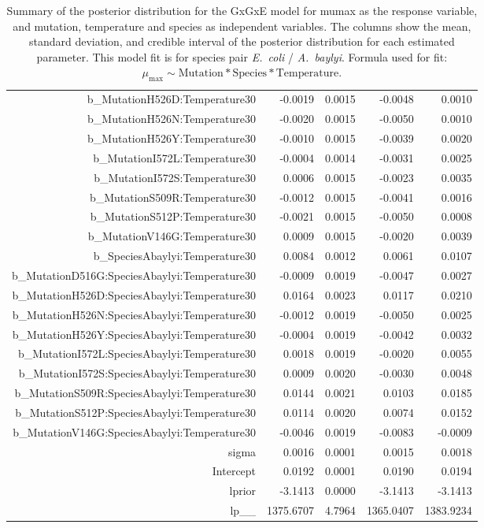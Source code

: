 \begin{table}[ht]
\begin{tabular}{rrrrr}
  b\_MutationH526D:Temperature30 & -0.0019 & 0.0015 & -0.0048 & 0.0010 \\ 
  b\_MutationH526N:Temperature30 & -0.0020 & 0.0015 & -0.0050 & 0.0010 \\ 
  b\_MutationH526Y:Temperature30 & -0.0010 & 0.0015 & -0.0039 & 0.0020 \\ 
  b\_MutationI572L:Temperature30 & -0.0004 & 0.0014 & -0.0031 & 0.0025 \\ 
  b\_MutationI572S:Temperature30 & 0.0006 & 0.0015 & -0.0023 & 0.0035 \\ 
  b\_MutationS509R:Temperature30 & -0.0012 & 0.0015 & -0.0041 & 0.0016 \\ 
  b\_MutationS512P:Temperature30 & -0.0021 & 0.0015 & -0.0050 & 0.0008 \\ 
  b\_MutationV146G:Temperature30 & 0.0009 & 0.0015 & -0.0020 & 0.0039 \\ 
  b\_SpeciesAbaylyi:Temperature30 & 0.0084 & 0.0012 & 0.0061 & 0.0107 \\ 
  b\_MutationD516G:SpeciesAbaylyi:Temperature30 & -0.0009 & 0.0019 & -0.0047 & 0.0027 \\ 
  b\_MutationH526D:SpeciesAbaylyi:Temperature30 & 0.0164 & 0.0023 & 0.0117 & 0.0210 \\ 
  b\_MutationH526N:SpeciesAbaylyi:Temperature30 & -0.0012 & 0.0019 & -0.0050 & 0.0025 \\ 
  b\_MutationH526Y:SpeciesAbaylyi:Temperature30 & -0.0004 & 0.0019 & -0.0042 & 0.0032 \\ 
  b\_MutationI572L:SpeciesAbaylyi:Temperature30 & 0.0018 & 0.0019 & -0.0020 & 0.0055 \\ 
  b\_MutationI572S:SpeciesAbaylyi:Temperature30 & 0.0009 & 0.0020 & -0.0030 & 0.0048 \\ 
  b\_MutationS509R:SpeciesAbaylyi:Temperature30 & 0.0144 & 0.0021 & 0.0103 & 0.0185 \\ 
  b\_MutationS512P:SpeciesAbaylyi:Temperature30 & 0.0114 & 0.0020 & 0.0074 & 0.0152 \\ 
  b\_MutationV146G:SpeciesAbaylyi:Temperature30 & -0.0046 & 0.0019 & -0.0083 & -0.0009 \\ 
  sigma & 0.0016 & 0.0001 & 0.0015 & 0.0018 \\ 
  Intercept & 0.0192 & 0.0001 & 0.0190 & 0.0194 \\ 
  lprior & -3.1413 & 0.0000 & -3.1413 & -3.1413 \\ 
  lp\_\_ & 1375.6707 & 4.7964 & 1365.0407 & 1383.9234 \\ 
   \hline
\end{tabular}
\endgroup
\caption{Summary of the posterior distribution for the GxGxE model for mumax as the response variable, and mutation, temperature and species as independent variables. The columns show the mean, standard deviation, and credible interval of the posterior distribution for each estimated parameter. This model fit is for species pair \textit{E.~coli} / \textit{A.~baylyi}. Formula used for fit: $\mu_{\text{max}} \sim \text{Mutation} * \text{Species} * \text{Temperature}$.} 
\label{supptab:GxGxE_mumax}
\end{table}



